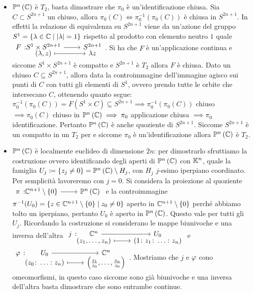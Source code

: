 \begin{itemize}
	\item $\proj[n]{\complexset}$ è $T_2$, basta dimostrare che $\pi_0$ è un'identificazione chiusa. Sia $C\subset S^{2n+1}$ un chiuso, allora $\pi_0(C)\iff \pi_0^{-1}(\pi_0(C))$ è chiusa in $S^{2n+1}$. In effetti la relazione di equivalenza su $S^{2n+1}$ viene da un'azione del gruppo $S^1=\{\lambda\in\mathbb{C} \mid |\lambda |=1\}$ rispetto al prodotto con elemento neutro $1$ quale $\funztot F {S^1\times S^{2n+1}} {S^{2n+1}} {(\lambda, z)} {\lambda z}$. Si ha che $F$ è un'applicazione continua e siccome $S^1\times S^{2n+1}$ è compatto e $S^{2n+1}$ è $T_2$ allora $F$ è chiusa. Dato un chiuso $C\subseteq S^{2n+1}$, allora data la controimmagine dell'immagine agisco sui punti di $C$ con tutti gli elementi di $S^1$, ovvero prendo tutte le orbite che intersecano $C$, ottenendo quanto segue:	
	$\pi_0^{-1}(\pi_0(C))=F(S^1\times C)\subseteq S^{2n+1} \implies \pi_0^{-1}(\pi_0(C))$ chiuso $\implies \pi_0(C)$ chiuso in $\proj[n]{\complexset} \implies \pi_0$ applicazione chiusa $\implies \pi_0$ identificazione. Pertanto $\proj[n]{\complexset}$ è anche quoziente di $S^{2n+1}$. Siccome $S^{2n+1}$ è un compatto in un $T_2$ per 
	e siccome $\pi_0$ è un'identificazione allora $\proj[n]{\complexset}$ è $T_2$.
	\item $\proj[n]{\complexset}$ è localmente euclideo di dimensione $2n$: per dimostrarlo sfruttiamo la costruzione
	ovvero identificando degli aperti di $\proj[n]{\complexset}$ con $\mathbb{K}^n$, quale la famiglia $U_j\coloneqq\{z_j\neq 0\}=\proj[n]{\complexset}\setminus H_j$, con $H_j$ $j$-esimo iperpiano coordinato. Per semplicità lavoreremo con $j=0$.\newline 
	Si considera la proiezione al quoziente $\funz \pi {\complexset^{n+1}\setminus\{0\}} {\proj[n]{\complexset}}$ e la controimmagine $\pi^{-1}(U_0)=\{z\in\mathbb{C}^{n+1}\setminus\{0\}\mid z_0\neq 0\}$ aperto in $\mathbb{C}^{n+1}\setminus\{0\}$ perché abbiamo tolto un iperpiano, pertanto $U_0$ è aperto in $\proj[n]{\complexset}$. Questo vale per tutti gli $U_j$. Ricordando la costruzione 
	 si considerano le mappe biunivoche e una inversa dell'altra $\funztot j {\complexset^n} {U_0} {(z_1,\dots,z_n)} {(1\colon z_1\colon \dots\colon z_n)}$ e $\funztot \oldphi {U_0} {\complexset^n} {(z_0\colon\dots\colon z_n)} {\left( \frac{z_1}{z_0},\dots,\frac{z_n}{z_0} \right)}$. Mostriamo che $j$ e $\oldphi$ cono omeomorfismi, in questo caso siccome sono già biunivoche e una inversa dell'altra basta dimostrare che sono entrambe continue.

\end{itemize}
